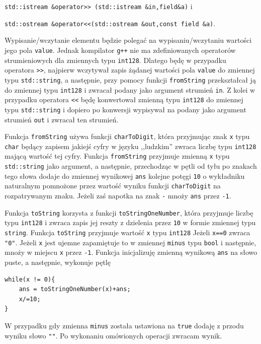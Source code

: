 \documentclass{article}
\begin{document}
\texttt{std::istream \&operator>> (std::istream \&in,field\&a)} i

\texttt{std::ostream \&operator<<(std::ostream \&out,const field \&a)}.

Wypisanie/wczytanie elementu będzie polegać na wypisaniu/wczytaniu 
wartości jego pola \texttt{value}. Jednak kompilator \texttt{g++} nie ma zdefiniowanych operatorów strumieniowych 
dla zmiennych typu \texttt{\textunderscore \textunderscore int128}. Dlatego będę w przypadku operatora \texttt{>>}, najpierw
wczytywał zapis żądanej wartości pola \texttt{value} do zmiennej typu \texttt{std::string}, a następnie, przy pomocy funkcji 
\texttt{fromString} przekształcał ją do zmiennej typu \texttt{\textunderscore \textunderscore int128} i zwracał podany 
jako argument strumień \texttt{in}. Z kolei w przypadku operatora \texttt{<<} będę konwertował zmienną typu 
\texttt{\textunderscore \textunderscore int128} do zmiennej typu \texttt{std::string} i dopiero po konwersji
wypisywał na podany jako argument strumień \texttt{out} i zwracał ten strumień.

Funkcja \texttt{fromString} używa funkcji \texttt{charToDigit}, która przyjmując znak \texttt{x} typu 
\texttt{char} będący zapisem jakiejś cyfry w języku ,,ludzkim'' zwraca liczbę typu 
\texttt{\textunderscore \textunderscore int128} mającą wartość tej cyfry. Funkcja \texttt{fromString} przyjmuje 
zmienną \texttt{x} typu \texttt{std::string} jako argument, a następnie, przechodząc w pętli od tyłu
po znakach tego słowa
dodaje do zmiennej wynikowej \texttt{ans} kolejne potęgi \texttt{10} o wykładniku naturalnym pomnożone przez wartość
wyniku funkcji \texttt{charToDigit} na rozpatrywanym znaku. Jeżeli zaś napotka na znak \texttt{-} mnoży \texttt{ans}
przez \texttt{-1}.

Funkcja \texttt{toString} korzysta z funkcji \texttt{toStringOneNumber}, która przyjmuje liczbę typu \texttt{\textunderscore \textunderscore int128}
i zwraca zapis jej reszty z dzielenia przez \texttt{10} w formie zmiennej typu \texttt{string}.
Funkcja \texttt{toString} 
przyjmuje wartość \texttt{x} typu \texttt{\textunderscore \textunderscore int128}
Jeżeli \texttt{x==0} zwraca \texttt{"0"}. Jeżeli \texttt{x} jest ujemne zapamiętuje to w zmiennej
\texttt{minus} typu \texttt{bool} i następnie, mnoży w miejscu \texttt{x} przez \texttt{-1}. 
Funkcja inicjalizuję zmienną wynikową \texttt{ans} na słowo puste, a następnie, wykonuje pętlę
\begin{lstlisting}
while(x != 0){
    ans = toStringOneNumber(x)+ans;
    x/=10;
}
\end{lstlisting}
W przypadku gdy zmienna \texttt{minus} została ustawiona na \texttt{true} dodaję z przodu wyniku słowo \texttt{"\textminus"}.
Po wykonaniu omówionych operacji zwracam wynik. 
\end{document}
